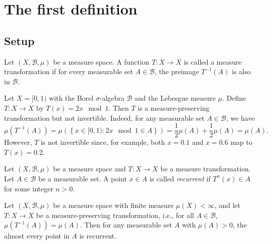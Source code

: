 \section{The first definition}

\subsection{Setup}

    \begin{definition}\label{def:measure_transformation}
        Let \((X, \mathcal{B}, \mu)\) be a measure space. 
        A function \(T: X \to X\) is called a measure transformation if for every measurable set \(A \in \mathcal{B}\), the preimage \(T^{-1}(A)\) is also in \(\mathcal{B}\).
    \end{definition}

    \begin{example}\label{eg:measure_preserving_but_not_invertible}
        Let \(X = [0, 1)\) with the Borel \(\sigma\)-algebra \(\mathcal{B}\) and the Lebesgue measure \(\mu\).
        Define \(T: X \to X\) by \(T(x) = 2x \mod 1\).
        Then \(T\) is a measure-preserving transformation but not invertible.
        Indeed, for any measurable set \(A \in \mathcal{B}\), we have
        \[
            \mu(T^{-1}(A)) = \mu\left( \left\{ x \in [0, 1) : 2x \mod 1 \in A \right\} \right) = \frac{1}{2} \mu(A) + \frac{1}{2} \mu(A) = \mu(A).
        \]
        However, \(T\) is not invertible since, for example, both \(x = 0.1\) and \(x = 0.6\) map to \(T(x) = 0.2\).
    \end{example}

    \begin{definition}\label{def:recurrent}
        Let \((X, \mathcal{B}, \mu)\) be a measure space and \(T: X \to X\) be a measure transformation.
        Let \(A \in \mathcal{B}\) be a measurable set.
        A point \(x \in A\) is called \emph{recurrent} if \(T^n(x) \in A\) for some integer \(n > 0\).
    \end{definition}

    \begin{theorem}\label{thm:poincare_recurrence_theorem}
        Let $(X, \mathcal{B}, \mu)$ be a measure space with finite measure $\mu(X) < \infty$, 
        and let $T: X \to X$ be a measure-preserving transformation, i.e., for all $A \in \mathcal{B}$, $\mu(T^{-1}(A)) = \mu(A)$. 
        Then for any measurable set $A$ with $\mu(A) > 0$, the almost every point in $A$ is recurrent.
    \end{theorem}

